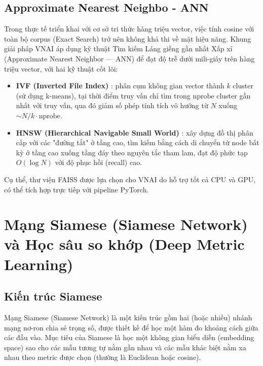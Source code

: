 \subsection{Approximate Nearest Neighbo - ANN}

Trong thực tế triển khai với cơ sở tri thức hàng triệu vector, việc tính cosine với toàn bộ corpus (Exact Search) trở nên không khả thi về mặt hiệu năng. Khung giải pháp VNAI áp dụng kỹ thuật Tìm kiếm Láng giềng gần nhất Xấp xỉ (Approximate Nearest Neighbor --- ANN) để đạt độ trễ dưới mili-giây trên hàng triệu vector, với hai kỹ thuật cốt lõi:
\begin{itemize}[leftmargin=*]
\item \textbf{IVF (Inverted File Index)} \cite{Johnson2017FAISS}: phân cụm không gian vector thành $k$ cluster (sử dụng k-means), tại thời điểm truy vấn chỉ tìm trong $\text{nprobe}$ cluster gần nhất với truy vấn, qua đó giảm số phép tính tích vô hướng từ $N$ xuống $\sim N/k \cdot \text{nprobe}$.
\item \textbf{HNSW (Hierarchical Navigable Small World)} \cite{Malkov2018HNSW}: xây dựng đồ thị phân cấp với các "đường tắt" ở tầng cao, tìm kiếm bằng cách di chuyển từ node bất kỳ ở tầng cao xuống tầng đáy theo nguyên tắc tham lam, đạt độ phức tạp $O(\log N)$ với độ phục hồi (recall) cao.
\end{itemize}

Cụ thể, thư viện FAISS được lựa chọn cho VNAI do hỗ trợ tốt cả CPU và GPU, có thể tích hợp trực tiếp với pipeline PyTorch.

\section{Mạng Siamese (Siamese Network) và Học sâu so khớp (Deep Metric Learning)}
\label{sec:siamese}

\subsection{Kiến trúc Siamese}

Mạng Siamese (Siamese Network) \cite{Bromley1993Siamese} là một kiến trúc gồm hai (hoặc nhiều) nhánh mạng nơ-ron chia sẻ trọng số, được thiết kế để học một hàm đo khoảng cách giữa các đầu vào. Mục tiêu của Siamese là học một không gian biểu diễn (embedding space) sao cho các mẫu tương tự nằm gần nhau và các mẫu khác biệt nằm xa nhau theo metric được chọn (thường là Euclidean hoặc cosine).


